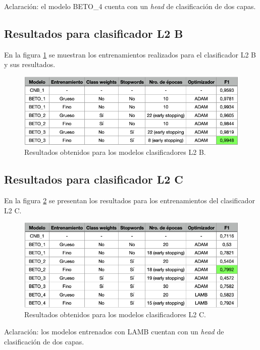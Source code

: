 Aclaración: el modelo BETO\_4 cuenta con un \textit{head} de clasificación de dos capas.

\subsection{Resultados para clasificador L2 B}

En la figura \ref{fig:res-l2b} se muestran los entrenamientos realizados para el clasificador L2 B y sus resultados.

\begin{figure}[htbp]
	\centering
	\includegraphics[width=1\textwidth]{./Figures/cap4-resultados-l2b.png}
	\caption{Resultados obtenidos para los modelos clasificadores L2 B.}
	\label{fig:res-l2b}
\end{figure}

\subsection{Resultados para clasificador L2 C}

En la figura \ref{fig:res-l2c} se presentan los resultados para los entrenamientos del clasificador L2 C.

\begin{figure}[H]
	\centering
	\includegraphics[width=1\textwidth]{./Figures/cap4-resultados-l2c.png}
	\caption{Resultados obtenidos para los modelos clasificadores L2 C.}
	\label{fig:res-l2c}
\end{figure}

Aclaración: los modelos entrenados con LAMB cuentan con un \textit{head} de clasificación de dos capas.

